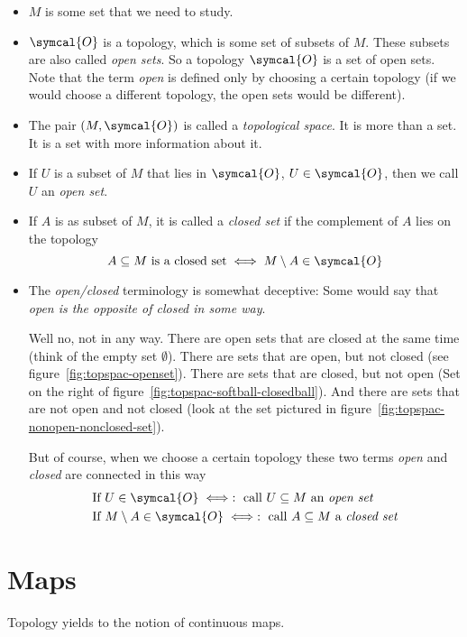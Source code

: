 \begin{itemize}
  \item $M$ is some set that we need to study.
  \item $\symcal{O}$ is a topology, which is some set of subsets of $M$. These subsets
    are also called
    \emph{open sets}. So a topology $\symcal{O}$ is a set of open sets. Note that the
    term \emph{open} is defined only by choosing a certain topology (if we would choose
    a different topology, the open sets would be different).
  \item The pair $(M, \symcal{O})$ is called a \emph{topological space}. It is more than
    a set. It is a set with more information about it.
  \item If $U$ is a subset of $M$ that lies in $\symcal{O}$, $U\in\symcal{O}$, then we
    call $U$ an \emph{open set}.
  \item If $A$ is as subset of $M$, it is called a \emph{closed set} if the complement
    of $A$ lies on the topology
    \[
      A\subseteq M \text{ is a closed set} \iff  M\setminus A\in\symcal{O}
    \]
  \item The \emph{open/closed} terminology is somewhat deceptive:
    Some would say that \emph{open is the opposite of closed in some way}.

    Well no, not in any way. There are open sets that are closed at the same time
    (think of the empty set $\emptyset$).
    There are sets that are open, but not closed (see figure~\ref{fig:topspac-openset}).
    There are sets that are closed, but not open (Set on the right of
    figure~\ref{fig:topspac-softball-closedball}).
    And there are sets that are not open and not closed (look at the set pictured in
    figure~\ref{fig:topspac-nonopen-nonclosed-set}).

    But of course, when we choose a certain topology these two terms \emph{open} and
    \emph{closed} are
    connected in this way
    \begin{align*}
      & \text{If } U\in\symcal{O}
        \iff : \text{ call } U\subseteq M \text{ an \emph{open set}}\\
      & \text{If } M\setminus A\in\symcal{O}
        \iff : \text{ call } A\subseteq M \text{ a \emph{closed set}}
    \end{align*}
    
  \end{itemize}
  
  \section{Maps}
  Topology yields to the notion of continuous maps.
